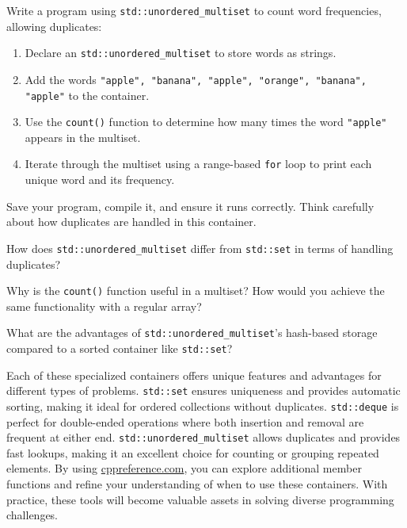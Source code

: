 \begin{challenge}
    \begin{task}
        Write a program using \texttt{std::unordered\_multiset} to count word frequencies, allowing duplicates:
        \begin{enumerate}
            \item Declare an \texttt{std::unordered\_multiset} to store words as strings.
            \item Add the words \texttt{"apple", "banana", "apple", "orange", "banana", "apple"} to the container.
            \item Use the \texttt{count()} function to determine how many times the word \texttt{"apple"} appears in the multiset.
            \item Iterate through the multiset using a range-based \texttt{for} loop to print each unique word and its frequency.
        \end{enumerate}

        Save your program, compile it, and ensure it runs correctly. Think carefully about how duplicates are handled in this container.

        \begin{questions}
            \item How does \texttt{std::unordered\_multiset} differ from \texttt{std::set} in terms of handling duplicates?
            \item Why is the \texttt{count()} function useful in a multiset? How would you achieve the same functionality with a regular array?
            \item What are the advantages of \texttt{std::unordered\_multiset}'s hash-based storage compared to a sorted container like \texttt{std::set}?
        \end{questions}
    \end{task}

    \begin{advise}
        Each of these specialized containers offers unique features and advantages for different types of problems. 
        \texttt{std::set} ensures uniqueness and provides automatic sorting, making it ideal for ordered collections without duplicates. 
        \texttt{std::deque} is perfect for double-ended operations where both insertion and removal are frequent at either end. 
        \texttt{std::unordered\_multiset} allows duplicates and provides fast lookups, making it an excellent choice for counting or grouping repeated elements. 
        By using \href{https://en.cppreference.com/}{cppreference.com}, you can explore additional member functions and refine your understanding of when to use these containers. 
        With practice, these tools will become valuable assets in solving diverse programming challenges.
    \end{advise}
\end{challenge}
